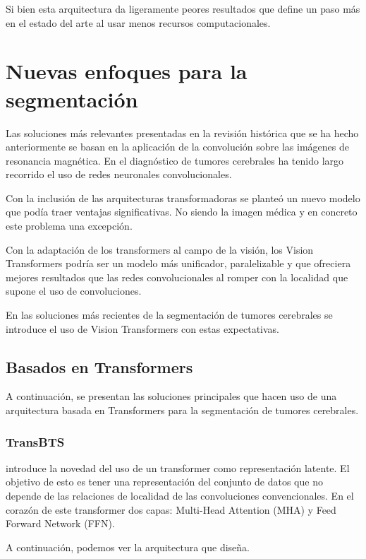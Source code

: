 		Si bien esta arquitectura da ligeramente peores resultados que \cite{myronenko20193d} define un paso más en el estado del arte al usar menos recursos computacionales.


\section{Nuevas enfoques para la segmentación}

	Las soluciones más relevantes presentadas en la revisión histórica que se ha hecho anteriormente se basan en la aplicación de la convolución sobre las imágenes de resonancia magnética. En el diagnóstico de tumores cerebrales ha tenido largo recorrido el uso de redes neuronales convolucionales. 
	
	Con la inclusión de las arquitecturas transformadoras se planteó un nuevo modelo que podía traer ventajas significativas. No siendo la imagen médica y en concreto este problema una excepción.
	
	Con la adaptación de los transformers al campo de la visión, los Vision Transformers podría ser un modelo más unificador, paralelizable y que ofreciera mejores resultados que las redes convolucionales al romper con la localidad que supone el uso de convoluciones. 
	
	En las soluciones más recientes de la segmentación de tumores cerebrales se introduce el uso de Vision Transformers con estas expectativas.
	
	\subsection{Basados en Transformers}
	
	A continuación, se presentan las soluciones principales que hacen uso de una arquitectura basada en Transformers para la segmentación de tumores cerebrales.
	
	\subsubsection{TransBTS}
	
	\cite{wenxuan2021transbts} introduce la novedad del uso de un transformer como representación latente. El objetivo de esto es tener una representación del conjunto de datos que no depende de las relaciones de localidad de las convoluciones convencionales. En el corazón de este transformer dos capas: Multi-Head Attention (MHA) y Feed Forward Network (FFN).
	
	A continuación, podemos ver la arquitectura que diseña.
	
